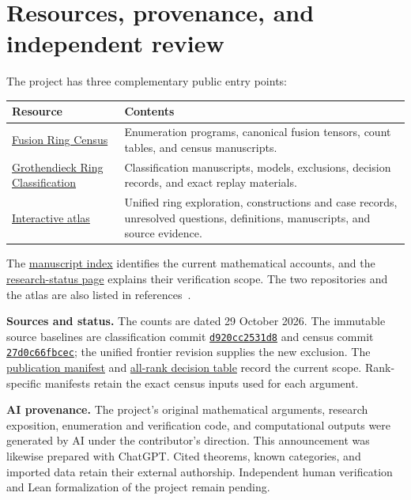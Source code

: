 \documentclass[11pt,a4paper]{article}
\newcommand{\classcommit}{d920cc2531d8b03583c797886a3c2ab6170a281a}
\newcommand{\censuscommit}{27d0c66fbcec1b399c0e39b4b9dcff71bbf7150f}
\newcommand{\classrepo}{https://github.com/sebastienpalcoux/grothendieck-ring-classification}
\newcommand{\censusrepo}{https://github.com/sebastienpalcoux/fusion-ring-census}
\newcommand{\atlas}{https://sebastienpalcoux.github.io/grothendieck-ring-classification}
\begin{document}
\section{Resources, provenance, and independent review}
The project has three complementary public entry points:
\begin{center}\small
\begin{tabularx}{\textwidth}{@{}l X@{}}
\toprule
Resource & Contents\\
\midrule
\href{\censusrepo}{Fusion Ring Census} & Enumeration programs, canonical fusion tensors,
count tables, and census manuscripts.\\[3pt]
\href{\classrepo}{Grothendieck Ring Classification} & Classification manuscripts,
models, exclusions, decision records, and exact replay materials.\\[3pt]
\href{\atlas/}{Interactive atlas} & Unified ring exploration, constructions and case
records, unresolved questions, definitions, manuscripts, and source evidence.\\
\bottomrule
\end{tabularx}
\end{center}
The \href{\atlas/\#papers}{manuscript index} identifies the current
mathematical accounts, and the
\href{\atlas/review.html}{research-status page} explains their verification
scope. The two repositories and the atlas are also listed in
references~\cite{Census,Classification,Atlas}.

\textbf{Sources and status.}
The counts are dated 29 October 2026. The immutable source baselines are
classification commit
\href{\classrepo/tree/\classcommit}{\texttt{d920cc2531d8}} and census
commit \href{\censusrepo/tree/\censuscommit}{\texttt{27d0c66fbcec}};
the unified frontier revision supplies the new exclusion.
The \href{\classrepo/blob/main/data/current_publication_revision.json}{publication manifest}
and \href{\classrepo/blob/main/data/classification_summary_all_ranks.csv}{all-rank decision table}
record the current scope. Rank-specific manifests retain the exact
census inputs used for each argument.

\textbf{AI provenance.}
The project's original mathematical arguments, research exposition,
enumeration and verification code, and computational outputs were generated
by AI under the contributor's direction. This announcement was likewise
prepared with ChatGPT. Cited theorems, known categories, and imported data
retain their external authorship. Independent human verification and
Lean formalization of the project remain pending.
\end{document}
